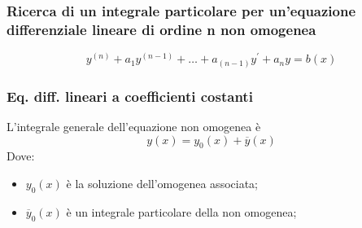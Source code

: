 \subsubsection{Ricerca di un integrale particolare per un'equazione differenziale lineare di ordine n non omogenea}
\begin{equation*}
	\boxed{y^{(n)} +a_1y^{(n-1)}+\dots+a_{(n-1)}y^\prime+a_ny=b(x)}
\end{equation*}
\subsubsection{Eq. diff. lineari a coefficienti costanti}
L’integrale generale dell’equazione non omogenea è
\begin{equation*}
	\boxed{y(x)=y_0(x)+\overline{y}(x)}
\end{equation*}
Dove:
\begin{itemize}
	\item $y_0(x)$ è la soluzione dell'omogenea associata;
	\item $\overline{y}_0(x)$ è un integrale particolare della non omogenea;
\end{itemize}
